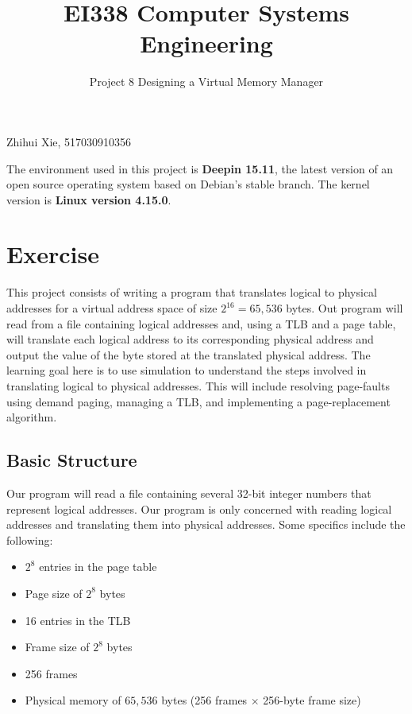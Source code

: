 \documentclass{article}
\title{EI338 Computer Systems Engineering}
\author{Project 8 Designing a Virtual Memory Manager}
\begin{document}
\maketitle

\begin{center}
    Zhihui Xie, 517030910356
\end{center}

The environment used in this project is \textbf{Deepin 15.11}, the latest version of an open source operating system based on Debian's stable branch. The kernel version is \textbf{Linux version 4.15.0}.

\section*{Exercise}
This project consists of writing a program that translates logical to physical
addresses for a virtual address space of size $2^16 = 65,536$ bytes. Out program
will read from a file containing logical addresses and, using a TLB and a page
table, will translate each logical address to its corresponding physical address
and output the value of the byte stored at the translated physical address.
The learning goal here is to use simulation to understand the steps involved in
translating logical to physical addresses. This will include resolving page-faults
using demand paging, managing a TLB, and implementing a page-replacement algorithm.

\subsection*{Basic Structure}
Our program will read a file containing several 32-bit integer numbers that represent logical addresses. Our program is only concerned with reading logical addresses and translating them into physical addresses. Some specifics include the following: 

\begin{itemize}
    \item $2^8$ entries in the page table
    \item Page size of $2^8$ bytes
    \item 16 entries in the TLB
    \item Frame size of $2^8$ bytes
    \item 256 frames
    \item Physical memory of $65,536$ bytes  (256 frames $\times$ 256-byte frame size)
\end{itemize}
\end{document}

